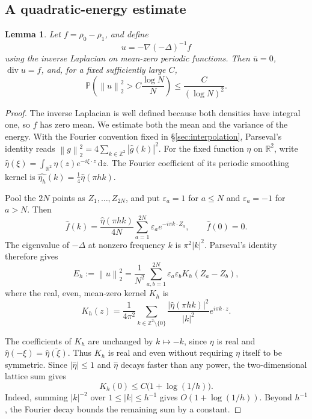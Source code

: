 \documentclass[11pt]{article}
\newcommand{\Pbb}{\mathbb P}
\newcommand{\R}{\mathbb R}
\newcommand{\Z}{\mathbb Z}
\newcommand{\diver}{\operatorname{div}}
\newcommand{\norm}[1]{\left\lVert #1\right\rVert}
\newcommand{\eps}{\varepsilon}
\newtheorem{lemma}[theorem]{Lemma}
\theoremstyle{remark}
\numberwithin{equation}{section}
\begin{document}
\subsection{A quadratic-energy estimate}

\begin{lemma}
\label{lem:energy}
Let \(f=\rho_0-\rho_1\), and define
\[
 u=-\nabla(-\Delta)^{-1}f
\]
using the inverse Laplacian on mean-zero periodic functions. Then
\(\overline u=0\), \(\diver u=f\), and, for a fixed sufficiently
large \(C\),
\[
 \Pbb\left(\norm u_2^2>C\frac{\log N}{N}\right)
 \le \frac{C}{(\log N)^2}.
\]
\end{lemma}

\begin{proof}
The inverse Laplacian is well defined because both densities have
integral one, so \(f\) has zero mean. We estimate both the mean and
the variance of the energy. With the
Fourier convention fixed in \S\ref{sec:interpolation}, Parseval's
identity reads \(\norm g_2^2=4\sum_{k\in\Z^2}|\widehat g(k)|^2\).
For the fixed function \(\eta\) on \(\R^2\), write
\(\widehat\eta(\xi)=\int_{\R^2}\eta(z)e^{-i\xi\cdot z}\,\mathrm dz\).
The Fourier coefficient of its periodic smoothing kernel is
\(\widehat{\eta_h}(k)=\frac14\widehat\eta(\pi hk)\).

Pool the \(2N\) points as \(Z_1,\ldots,Z_{2N}\), and put
\(\eps_a=1\) for \(a\le N\) and \(\eps_a=-1\) for \(a>N\).
Then
\[
 \widehat f(k)=
 \frac{\widehat\eta(\pi hk)}{4N}
 \sum_{a=1}^{2N}\eps_a e^{-i\pi k\cdot Z_a},
 \qquad
 \widehat f(0)=0.
\]
The eigenvalue of \(-\Delta\) at nonzero frequency \(k\) is
\(\pi^2|k|^2\). Parseval's identity therefore gives
\begin{equation}
\label{eq:energy-kernel}
 E_h:=\norm u_2^2
 =\frac1{N^2}\sum_{a,b=1}^{2N}
   \eps_a\eps_b K_h(Z_a-Z_b),
\end{equation}
where the real, even, mean-zero kernel \(K_h\) is
\[
 K_h(z)=\frac1{4\pi^2}
 \sum_{k\in\Z^2\setminus\{0\}}
 \frac{|\widehat\eta(\pi hk)|^2}{|k|^2}e^{i\pi k\cdot z}.
\]

The coefficients of \(K_h\) are unchanged by \(k\mapsto-k\), since
\(\eta\) is real and
\(\widehat\eta(-\xi)=\overline{\widehat\eta(\xi)}\). Thus \(K_h\)
is real and even without requiring \(\eta\) itself to be symmetric.
Since \(|\widehat\eta|\le1\) and \(\widehat\eta\) decays faster than
any power, the two-dimensional lattice sum gives
\[
 K_h(0)\le C\bigl(1+\log(1/h)\bigr).
\]
Indeed, summing \(|k|^{-2}\) over \(1\le|k|\le h^{-1}\)
gives \(O(1+\log(1/h))\). Beyond \(h^{-1}\), the Fourier
decay bounds the remaining sum by a constant.


\end{proof}
\end{document}
